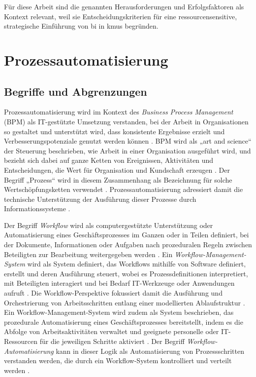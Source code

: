 Für diese Arbeit sind die genannten Herausforderungen und Erfolgsfaktoren als Kontext relevant, weil sie Entscheidungskriterien für eine ressourcensensitive, strategische Einführung von \gls{bi} in \glspl{kmu} begründen.


\section{Prozessautomatisierung}\label{sec:procauto}

\subsection{Begriffe und Abgrenzungen}
Prozessautomatisierung wird im Kontext des \emph{Business Process Management} (BPM) als IT-gestützte Umsetzung verstanden, bei der Arbeit in Organisationen so gestaltet und unterstützt wird, dass konsistente Ergebnisse erzielt und Verbesserungspotenziale genutzt werden können \cite{DumasEtAl2013}. BPM wird als „art and science“ der Steuerung beschrieben, wie Arbeit in einer Organisation ausgeführt wird, und bezieht sich dabei auf ganze Ketten von Ereignissen, Aktivitäten und Entscheidungen, die Wert für Organisation und Kundschaft erzeugen \cite{DumasEtAl2013}. Der Begriff „Prozess“ wird in diesem Zusammenhang als Bezeichnung für solche Wertschöpfungsketten verwendet \cite{DumasEtAl2013}. Prozessautomatisierung adressiert damit die technische Unterstützung der Ausführung dieser Prozesse durch Informationssysteme \cite{DumasEtAl2013}. 

Der Begriff \emph{Workflow} wird als computergestützte Unterstützung oder Automatisierung eines Geschäftsprozesses im Ganzen oder in Teilen definiert, bei der Dokumente, Informationen oder Aufgaben nach prozeduralen Regeln zwischen Beteiligten zur Bearbeitung weitergegeben werden \cite{Aalst2003WorkflowTutorial}. Ein \emph{Workflow-Management-System} wird als System definiert, das Workflows mithilfe von Software definiert, erstellt und deren Ausführung steuert, wobei es Prozessdefinitionen interpretiert, mit Beteiligten interagiert und bei Bedarf IT-Werkzeuge oder Anwendungen aufruft \cite{Aalst2003WorkflowTutorial}. Die Workflow-Perspektive fokussiert damit die Ausführung und Orchestrierung von Arbeitsschritten entlang einer modellierten Ablaufstruktur \cite{Aalst2003WorkflowTutorial}. Ein Workflow-Management-System wird zudem als System beschrieben, das prozedurale Automatisierung eines Geschäftsprozesses bereitstellt, indem es die Abfolge von Arbeitsaktivitäten verwaltet und geeignete personelle oder IT-Ressourcen für die jeweiligen Schritte aktiviert \cite{OMGWfMF12}. Der Begriff \emph{Workflow-Automatisierung} kann in dieser Logik als Automatisierung von Prozessschritten verstanden werden, die durch ein Workflow-System kontrolliert und verteilt werden \cite{OMGWfMF12}. 

